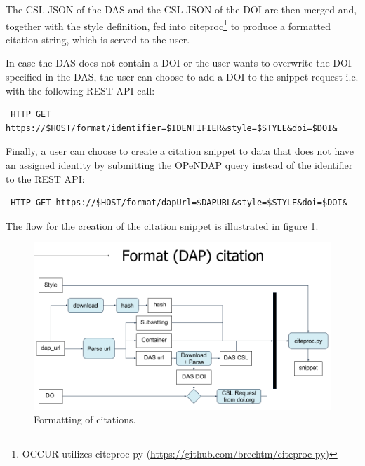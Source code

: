 \documentclass[letterpaper, twocolumn, parskip=half, fontsize=8pt, DIV=calc]{scrartcl}
\begin{document}
The CSL JSON of the DAS and the CSL JSON of the DOI are then merged and, together with the style definition, fed into citeproc\footnote{OCCUR utilizes citeproc-py (\url{https://github.com/brechtm/citeproc-py})} to produce a formatted citation string, which is served to the user.

In case the DAS does not contain a DOI or the user wants to overwrite the DOI specified in the DAS, the user can choose to add a DOI to the snippet request i.e. with the following REST API call:

\begin{lstlisting}
 HTTP GET https://$HOST/format/identifier=$IDENTIFIER&style=$STYLE&doi=$DOI&
\end{lstlisting}

Finally, a user can choose to create a citation snippet to data that does not have an assigned identity by submitting the OPeNDAP query instead of the identifier to the REST API:

\begin{lstlisting}
 HTTP GET https://$HOST/format/dapUrl=$DAPURL&style=$STYLE&doi=$DOI&
\end{lstlisting}

The flow for the creation of the citation snippet is illustrated in figure \ref{fig_format}.

\begin{figure}[ht]
 \includegraphics[width=\columnwidth]{figures/format.png}
 \caption{Formatting of citations.}
 \label{fig_format}
\end{figure}
\end{document}
